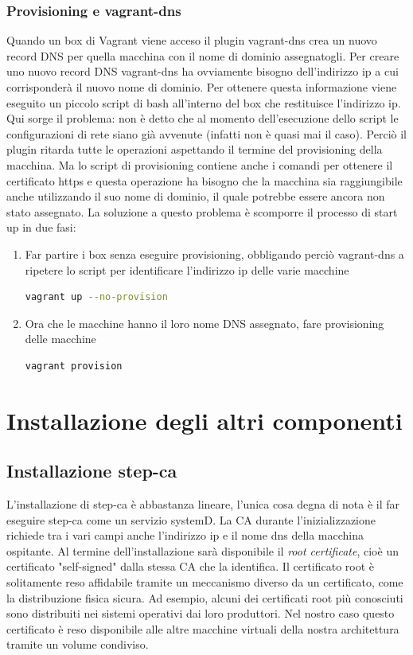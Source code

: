 \documentclass[12pt]{report}
\begin{document}
\subsection{Provisioning e vagrant-dns}
Quando un box di Vagrant viene acceso il plugin vagrant-dns crea un nuovo record DNS per quella macchina con il nome di dominio assegnatogli. Per creare uno nuovo record DNS vagrant-dns ha ovviamente bisogno dell'indirizzo ip a cui corrisponderà il nuovo nome di dominio. Per ottenere questa informazione viene eseguito un piccolo script di bash all'interno del box che restituisce l'indirizzo ip. Qui sorge il problema: non è detto che al momento dell'esecuzione dello script le configurazioni di rete siano già avvenute (infatti non è quasi mai il caso). Perciò il plugin ritarda tutte le operazioni aspettando il termine del provisioning della macchina. Ma lo script di provisioning contiene anche i comandi per ottenere il certificato https e questa operazione ha bisogno che la macchina sia raggiungibile anche utilizzando il suo nome di dominio, il quale potrebbe essere ancora non stato assegnato. La soluzione a questo problema è scomporre il processo di start up in due fasi:
\begin{enumerate}
    \item Far partire i box senza eseguire provisioning, obbligando perciò vagrant-dns a ripetere lo script per identificare l'indirizzo ip delle varie macchine
    \begin{lstlisting}[language=bash]
        vagrant up --no-provision
    \end{lstlisting}
    \item Ora che le macchine hanno il loro nome DNS assegnato, fare provisioning delle macchine
    \begin{lstlisting}[language=bash]
        vagrant provision
    \end{lstlisting}
\end{enumerate}

\chapter{Installazione degli altri componenti}
\section{Installazione step-ca}
L'installazione di step-ca è abbastanza lineare, l'unica cosa degna di nota è il far eseguire step-ca come un servizio systemD. La CA durante l'inizializzazione richiede tra i vari campi anche l'indirizzo ip e il nome dns della macchina ospitante. Al termine dell'installazione sarà disponibile il \textit{root certificate}, cioè un certificato "self-signed" dalla stessa CA che la identifica. Il certificato root è solitamente reso affidabile tramite un meccanismo diverso da un certificato, come la distribuzione fisica sicura. Ad esempio, alcuni dei certificati root più conosciuti sono distribuiti nei sistemi operativi dai loro produttori.
Nel nostro caso questo certificato è reso disponibile alle altre macchine virtuali della nostra architettura tramite un volume condiviso.
\end{document}

